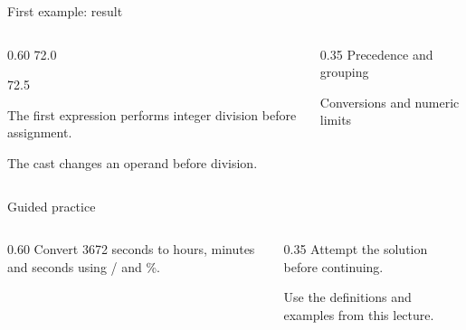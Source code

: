 \documentclass[10pt,aspectratio=169]{beamer}
\begin{document}
\begin{frame}[fragile,t]{First example: result}
\begin{columns}[T,onlytextwidth]\begin{column}{0.60\textwidth}
72.0\par 72.5\par The first expression performs integer division before assignment.\par The cast changes an operand before division.
\end{column}\begin{column}{0.35\textwidth}\small
Precedence and grouping

Conversions and numeric limits
\end{column}\end{columns}
\end{frame}

\begin{frame}[fragile,t]{Guided practice}
\begin{columns}[T,onlytextwidth]\begin{column}{0.60\textwidth}
Convert 3672 seconds to hours, minutes and seconds using / and \%.
\end{column}\begin{column}{0.35\textwidth}\small
Attempt the solution before continuing.

Use the definitions and examples from this lecture.
\end{column}\end{columns}
\end{frame}
\end{document}
